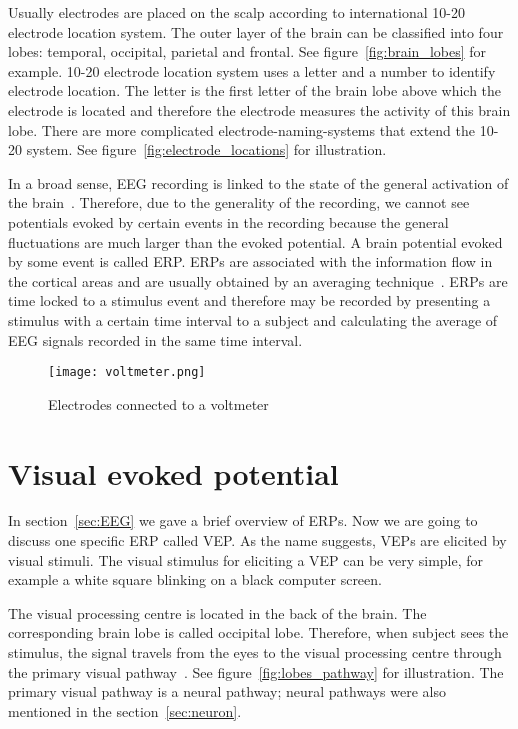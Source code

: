 Usually electrodes are placed on the scalp according to international 10-20 electrode location system. The outer layer of the brain can be classified into four lobes: temporal, occipital, parietal and frontal. See figure~\ref{fig:brain_lobes} for example. 10-20 electrode location system uses a letter and a number to identify electrode location. The letter is the first letter of the brain lobe above which the electrode is located and therefore the electrode measures the activity of this brain lobe. There are more complicated electrode-naming-systems that extend the 10-20 system. See figure~\ref{fig:electrode_locations} for illustration.

In a broad sense, \gls{EEG} recording is linked to the state of the general activation of the brain~\cite{VEP}. Therefore, due to the generality of the recording, we cannot see potentials evoked by certain events in the recording because the general fluctuations are much larger than the evoked potential. A brain potential evoked by some event is called \gls{ERP}. \glspl{ERP} are associated with the information flow in the cortical areas and are usually obtained by an averaging technique~\cite{ERP}. \glspl{ERP} are time locked to a stimulus event and therefore may be recorded by presenting a stimulus with a certain time interval to a subject and calculating the average of \gls{EEG} signals recorded in the same time interval.

\begin{figure}[h]
	\centering
	\texttt{[image: voltmeter.png]}
	\caption{Electrodes connected to a voltmeter~\cite[p.~120]{ERP}}
	\label{fig:voltmeter}
\end{figure}

\section{Visual evoked potential}
\label{sec:VEP}

In section~\ref{sec:EEG} we gave a brief overview of \glspl{ERP}. Now we are going to discuss one specific \gls{ERP} called \gls{VEP}. As the name suggests, \glspl{VEP} are elicited by visual stimuli. The visual stimulus for eliciting a \gls{VEP} can be very simple, for example a white square blinking on a black computer screen.

The visual processing centre is located in the back of the brain. The corresponding brain lobe is called occipital lobe. Therefore, when subject sees the stimulus, the signal travels from the eyes to the visual processing centre through the primary visual pathway~\cite{neuroscience}. See figure~\ref{fig:lobes_pathway} for illustration. The primary visual pathway is a neural pathway; neural pathways were also mentioned in the section~\ref{sec:neuron}.

